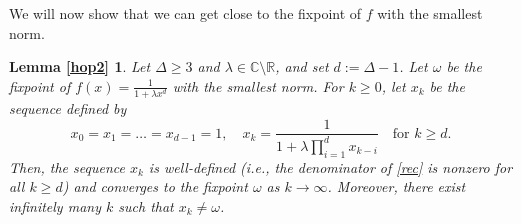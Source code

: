 \documentclass[11pt]{article}
\newtheorem*{lemhoptwo}{Lemma \ref{hop2}}
\def\Reals{\mathbb{R}}
\def\Complex{\mathbb{C}}
\begin{document}
We will now show that we can get close to the fixpoint of $f$ with the smallest norm.
\begin{lemhoptwo}
Let $\Delta\geq 3$ and $\lambda\in \Complex\setminus\Reals$, and set $d:=\Delta-1$. Let $\omega$ be the fixpoint of $f(x)=\frac{1}{1+\lambda x^{d}}$ with the smallest norm. For $k\geq 0$, let $x_k$ be the sequence defined by
\begin{equation}\label{rec}
x_0=x_1=\dots=x_{d-1}=1, \quad x_k = \frac{1}{1+\lambda \prod_{i=1}^d x_{k-i}}\quad\mbox{for $k\geq d$}.
\end{equation}
Then, the sequence $x_k$ is well-defined (i.e., the denominator of \eqref{rec} is nonzero for all $k\geq d$) and converges to the fixpoint $\omega$ as $k\rightarrow \infty$. Moreover, there exist infinitely many $k$ such that $x_k\neq \omega$.
\end{lemhoptwo}
\end{document}
